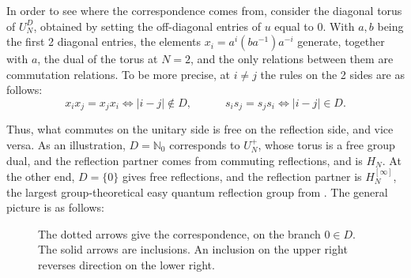 \documentclass[11pt,a4paper]{article}
\begin{document}
In order to see where the correspondence comes from, consider the diagonal torus of $U_N^D$, obtained by setting the off-diagonal entries of $u$ equal to $0$. With $a,b$ being the first 2 diagonal entries, the elements $x_i=a^i(ba^{-1})a^{-i}$ generate, together with $a$, the dual of the torus at $N=2$, and the only relations between them are commutation relations. To be more precise, at $i\neq j$ the rules on the 2 sides are as follows:
\[
 x_ix_j=x_jx_i\iff|i-j|\notin D,\qquad\quad s_is_j=s_js_i\iff|i-j|\in D.
\]

Thus, what commutes on the unitary side is free on the reflection side, and vice versa. As an illustration, $D=\mathbb N_0$ corresponds to $U_N^+$, whose torus is a free group dual, and the reflection partner comes from commuting reflections, and is $H_N$. At the other end, $D=\{0\}$ gives free reflections, and the reflection partner is $H_N^{[\infty]}$, the largest group-theoretical easy quantum reflection group from \cite{rw,full}. The general picture is as follows:

\begin{figure}[H]
\centering
{}
\caption{The dotted arrows give the correspondence, on the branch $0\in D$. The solid arrows are inclusions. An inclusion on the upper right reverses direction on the lower right.}
\label{classification}
\end{figure}
\end{document}
